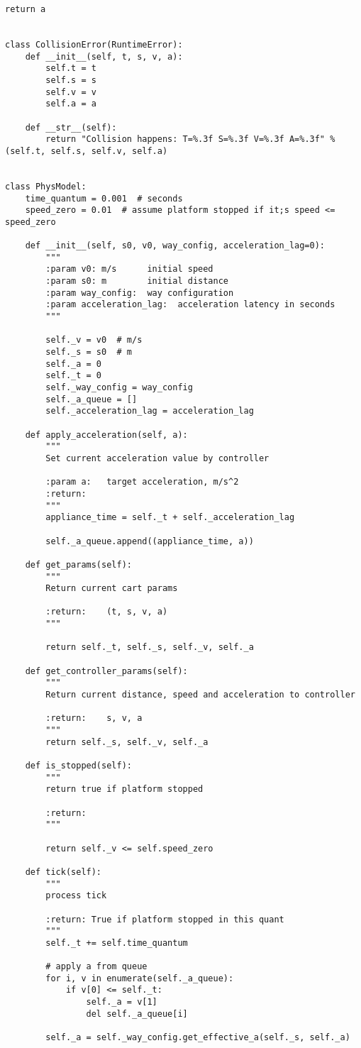 \begin{lstlisting}[style=pythonstyle,caption={ }, label=lst:func:1]
		return a


class CollisionError(RuntimeError):
	def __init__(self, t, s, v, a):
		self.t = t
		self.s = s
		self.v = v
		self.a = a

	def __str__(self):
		return "Collision happens: T=%.3f S=%.3f V=%.3f A=%.3f" % (self.t, self.s, self.v, self.a)


class PhysModel:
	time_quantum = 0.001  # seconds
	speed_zero = 0.01  # assume platform stopped if it;s speed <= speed_zero

	def __init__(self, s0, v0, way_config, acceleration_lag=0):
		"""
		:param v0: m/s		initial speed
		:param s0: m		initial distance
		:param way_config:  way configuration
		:param acceleration_lag:  acceleration latency in seconds
		"""

		self._v = v0  # m/s
		self._s = s0  # m
		self._a = 0
		self._t = 0
		self._way_config = way_config
		self._a_queue = []
		self._acceleration_lag = acceleration_lag

	def apply_acceleration(self, a):
		"""
		Set current acceleration value by controller

		:param a: 	target acceleration, m/s^2
		:return:
		"""
		appliance_time = self._t + self._acceleration_lag

		self._a_queue.append((appliance_time, a))

	def get_params(self):
		"""
		Return current cart params

		:return: 	(t, s, v, a)
		"""

		return self._t, self._s, self._v, self._a

	def get_controller_params(self):
		"""
		Return current distance, speed and acceleration to controller

		:return:	s, v, a
		"""
		return self._s, self._v, self._a

	def is_stopped(self):
		"""
		return true if platform stopped

		:return:
		"""

		return self._v <= self.speed_zero

	def tick(self):
		"""
		process tick

		:return: True if platform stopped in this quant
		"""
		self._t += self.time_quantum

		# apply a from queue
		for i, v in enumerate(self._a_queue):
			if v[0] <= self._t:
				self._a = v[1]
				del self._a_queue[i]

		self._a = self._way_config.get_effective_a(self._s, self._a)


\end{lstlisting}
